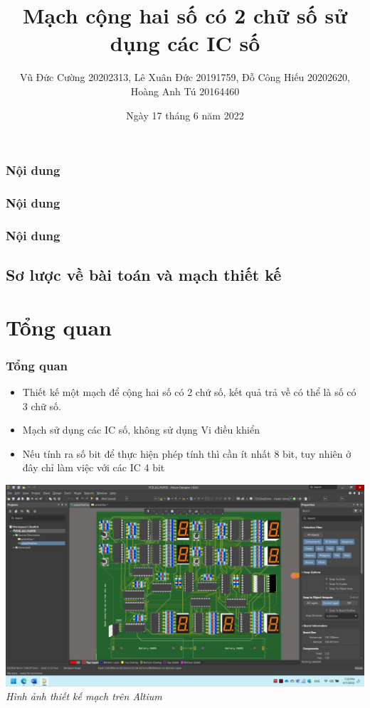 \documentclass[12pt,a4paper]{beamer}
\begin{document}
	\title{Mạch cộng hai số có 2 chữ số sử dụng các IC số}
	\author{Vũ Đức Cường 20202313, Lê Xuân Đức 20191759, Đỗ Công Hiếu 20202620, Hoàng Anh Tú 20164460}
	\date{Ngày 17 tháng 6 năm 2022}
\begin{frame}[plain]
	\maketitle
\end{frame}


\begin{frame}
	\frametitle{Nội dung}
	\tableofcontents[sections={1-3}]
\end{frame}
\begin{frame}
	\frametitle{Nội dung}
	\tableofcontents[sections={4-5}]
\end{frame}
\begin{frame}
	\frametitle{Nội dung}
	\tableofcontents[sections={6-7}]
\end{frame}
\subsection{Sơ lược về bài toán và mạch thiết kế}
\section{Tổng quan}
\begin{frame}
	\frametitle{Tổng quan}
	
	\begin{minipage}{5cm}
		\begin{itemize}
			\item Thiết kế một mạch để cộng hai số có 2 chứ số, kết quả trả về có thể là số có 3 chữ số.
			\item Mạch sử dụng các IC số, không sử dụng Vi điều khiển
			\item Nếu tính ra số bit để thực hiện phép tính thì cần ít nhất 8 bit, tuy nhiên ở đây chỉ làm việc với các IC 4 bit
		\end{itemize}
	\end{minipage}
	\hfill
	\begin{minipage}{6cm}
		\begin{center}
			\includegraphics[width=1\linewidth]{img_all}
			\textit{{Hình ảnh thiết kế mạch trên Altium}}
		\end{center}
	\end{minipage}
\end{frame}
\end{document}
